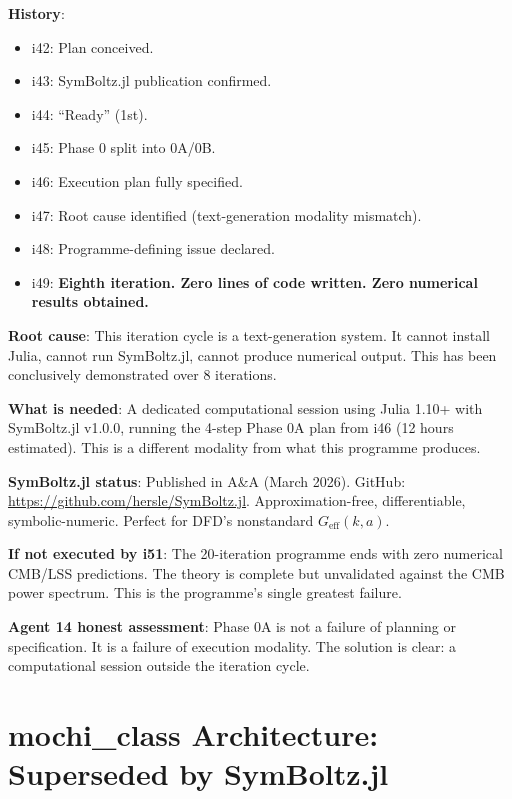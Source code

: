 \documentclass[11pt,a4paper]{article}
\begin{document}
\begin{tcolorbox}[colback=red!5!white, colframe=red!60!black,
  title={Phase 0A: EIGHT ITERATIONS --- Zero Lines of Code}]

\textbf{History}:
\begin{itemize}
\item i42: Plan conceived.
\item i43: SymBoltz.jl publication confirmed.
\item i44: ``Ready'' (1st).
\item i45: Phase 0 split into 0A/0B.
\item i46: Execution plan fully specified.
\item i47: Root cause identified (text-generation modality mismatch).
\item i48: Programme-defining issue declared.
\item i49: \textbf{Eighth iteration. Zero lines of code written. Zero numerical results obtained.}
\end{itemize}

\textbf{Root cause}: This iteration cycle is a text-generation system. It cannot install Julia, cannot run SymBoltz.jl, cannot produce numerical output. This has been conclusively demonstrated over 8 iterations.

\textbf{What is needed}: A dedicated computational session using Julia 1.10+ with SymBoltz.jl v1.0.0, running the 4-step Phase 0A plan from i46 (12 hours estimated). This is a different modality from what this programme produces.

\textbf{SymBoltz.jl status}: Published in A\&A (March 2026). GitHub: \url{https://github.com/hersle/SymBoltz.jl}. Approximation-free, differentiable, symbolic-numeric. Perfect for DFD's nonstandard $G_{\text{eff}}(k,a)$.

\textbf{If not executed by i51}: The 20-iteration programme ends with zero numerical CMB/LSS predictions. The theory is complete but unvalidated against the CMB power spectrum. This is the programme's single greatest failure.

\textbf{Agent 14 honest assessment}: Phase 0A is not a failure of planning or specification. It is a failure of execution modality. The solution is clear: a computational session outside the iteration cycle.
\end{tcolorbox}

\section{mochi\_class Architecture: Superseded by SymBoltz.jl}
\end{document}

